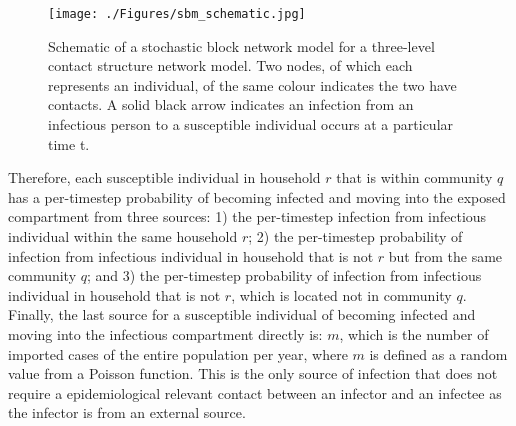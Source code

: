 \documentclass[a4paper]{article}
\begin{document}
	\begin{figure}[!ht]
		\begin{center}	
			\texttt{[image: ./Figures/sbm\_schematic.jpg]} 
		\end{center}
		\caption[Schematic of a three-level contact structure network model with three small clusters in each larger cluster at a particular time point]{Schematic of a stochastic block network model for a three-level contact structure network model. Two nodes, of which each represents an individual, of the same colour indicates the two have contacts. A solid black arrow indicates an infection from an infectious person to a susceptible individual occurs at a particular time t.}
		\label{fig:sbm}
	\end{figure}
	
	Therefore, each susceptible individual in household $r$ that is within community $q$ has a per-timestep probability of becoming infected and moving into the exposed compartment from three sources: 1) the per-timestep infection from infectious individual within the same household $r$; 2) the per-timestep probability of infection from infectious individual in household that is not $r$ but from the same community $q$; and 3) the per-timestep probability of infection from infectious individual in household that is not $r$, which is located not in community $q$. Finally, the last source for a susceptible individual of becoming infected and moving into the infectious compartment directly is: $m$, which is the number of imported cases of the entire population per year, where $m$ is defined as a random value from a Poisson function. This is the only source of infection that does not require a epidemiological relevant contact between an infector and an infectee as the infector is from an external source.
	
\end{document}
